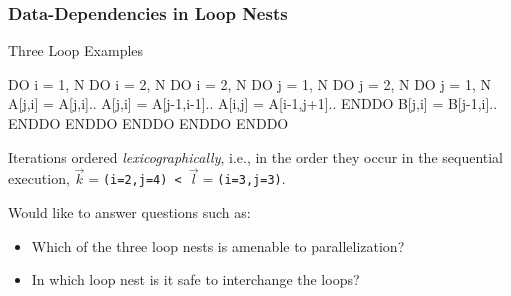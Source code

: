 \documentclass[rgb,dvipsnames]{beamer}
\newcommand{\emp}[1]{\textcolor{DikuRed}{ #1}}
\begin{document}
\begin{frame}[fragile,t]
  \frametitle{Data-Dependencies in Loop Nests} %

\begin{block}{Three Loop Examples}
\begin{colorcode}
DO i = 1, N         DO i = 2, N             DO i = 2, N
 DO j = 1, N         DO j = 2, N             DO j = 1, N 
  A[j,i] = A[j,i]..   A[j,i] = A[j-1,i-1]..   A[i,j] = A[i-1,j+1]..
 ENDDO                B[j,i] = B[j-1,i]..    ENDDO
ENDDO               ENDDO ENDDO             ENDDO
\end{colorcode}
\end{block} 

Iterations ordered {\em lexicographically}, i.e., in the order
they occur in the sequential execution, 
{\tt$\vec{k}=$(i=2,j=4) < $\vec{l}=$(i=3,j=3)}.

\bigskip

Would like to answer questions such as:
\begin{itemize}
    \item \emp{Which of the three loop nests is amenable to parallelization?}\smallskip
    \item \emp{In which loop nest is it safe to interchange the loops?}
\end{itemize}


\end{frame}
\end{document}
